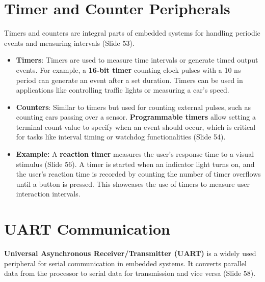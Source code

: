 \documentclass[
  14pt,
  a4paper,
  numbers=noendperiod,
  headinclude=true,
  footinclude=true,
  DIV=calc]{scrreprt}
\begin{document}
\section{Timer and Counter
Peripherals}\label{timer-and-counter-peripherals}

Timers and counters are integral parts of embedded systems for handling
periodic events and measuring intervals (Slide 53).

\begin{itemize}
\item
  \textbf{Timers}: Timers are used to measure time intervals or generate
  timed output events. For example, a \textbf{16-bit timer} counting
  clock pulses with a 10 ns period can generate an event after a set
  duration. Timers can be used in applications like controlling traffic
  lights or measuring a car's speed.
\item
  \textbf{Counters}: Similar to timers but used for counting external
  pulses, such as counting cars passing over a sensor.
  \textbf{Programmable timers} allow setting a terminal count value to
  specify when an event should occur, which is critical for tasks like
  interval timing or watchdog functionalities (Slide 54).
\item
  \textbf{Example:} A \textbf{reaction timer} measures the user's
  response time to a visual stimulus (Slide 56). A timer is started when
  an indicator light turns on, and the user's reaction time is recorded
  by counting the number of timer overflows until a button is pressed.
  This showcases the use of timers to measure user interaction
  intervals.
\end{itemize}

\section{UART Communication}\label{uart-communication}

\textbf{Universal Asynchronous Receiver/Transmitter (UART)} is a widely
used peripheral for serial communication in embedded systems. It
converts parallel data from the processor to serial data for
transmission and vice versa (Slide 58).
\end{document}
